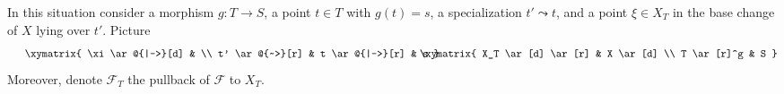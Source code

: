 \noindent
In this situation consider a morphism $g : T \to S$, a point $t \in T$
with $g(t) = s$, a specialization $t' \leadsto t$, and a point
$\xi \in X_T$ in the base change of $X$ lying over $t'$. Picture
\begin{equation}
\label{equation-impurity}
\vcenter{
\xymatrix{
\xi \ar@{|->}[d] & \\
t' \ar@{~>}[r] & t \ar@{|->}[r] & s
}
}
\quad\quad
\vcenter{
\xymatrix{
X_T \ar[d] \ar[r] & X \ar[d] \\
T \ar[r]^g & S
}
}
\end{equation}
Moreover, denote $\mathcal{F}_T$ the pullback of $\mathcal{F}$ to $X_T$.